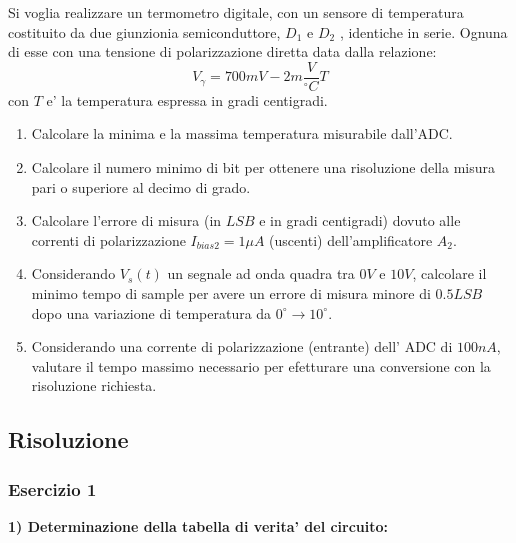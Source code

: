 \documentclass[\main/main.tex]{subfiles}
\begin{document}
Si voglia realizzare un termometro digitale, con un sensore di temperatura costituito da due giunzionia  semiconduttore, $D_1$ e $D_2$ , identiche in serie. Ognuna di esse con una tensione di polarizzazione diretta data dalla relazione:
\[V_{\gamma} = 700mV - 2m\frac{V}{^\circ C}T\]
con $T$ e' la temperatura espressa in gradi centigradi.

\begin{enumerate}
\item Calcolare la minima e la massima temperatura misurabile dall'ADC.
\item Calcolare il numero minimo di bit per ottenere una risoluzione della misura pari o superiore al decimo di grado.
\item Calcolare l'errore di misura (in $LSB$ e in gradi centigradi) dovuto alle correnti di polarizzazione $I_{bias2} = 1\mu A$ (uscenti) dell'amplificatore $A_2$.
\item Considerando $V_s(t)$ un segnale ad onda quadra tra $0V$ e $10V$, calcolare il minimo tempo di sample per avere un errore di misura minore di $0.5LSB$ dopo una variazione di temperatura da $0^\circ \longrightarrow 10^\circ$.
\item Considerando una corrente di polarizzazione (entrante) dell' ADC di $100nA$, valutare il tempo massimo necessario per efetturare una conversione con la risoluzione richiesta.
\end{enumerate}


\clearpage
\subsection{Risoluzione}
\subsubsection{Esercizio 1}

\textbf{1) Determinazione della tabella di verita' del circuito:}

\statinmos
\statipmos
\end{document}
